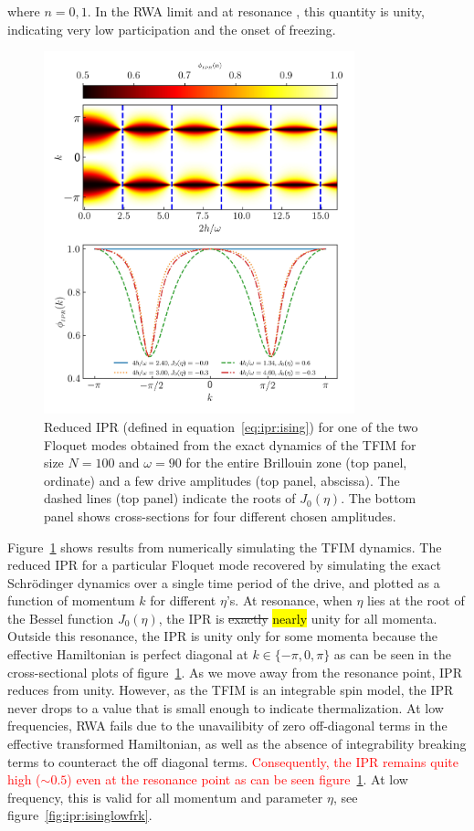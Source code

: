 \documentclass[%
reprint,
superscriptaddress,
linenumbers,
amsmath,amssymb,
aps,
prb,
showkeys,
]{revtex4-2}
\begin{document}
	where $n=0,1$. In the RWA limit and at resonance , this quantity is unity, indicating very low participation and the onset of freezing.
	\begin{figure}[t!]
		\centering
		\includegraphics[width = 9.0cm]{ising_exact_ipr.jpeg}
		\caption{Reduced IPR (defined in equation~\ref{eq:ipr:ising}) for one of the two Floquet modes obtained from the
			exact dynamics of the TFIM for size $N = 100$ and $\omega=90$ for the entire Brillouin zone (top panel, ordinate) and a few drive amplitudes (top panel, abscissa). The dashed lines (top panel) indicate the roots of $J_0(\eta)$.
			The bottom panel shows cross-sections for four different chosen amplitudes.}
		\label{fig:ipr:tfim}
	\end{figure}
	Figure~\ref{fig:ipr:tfim} shows results from numerically simulating the TFIM dynamics. The reduced IPR for a particular Floquet mode recovered by simulating the exact Schr\"odinger dynamics over a single time period of the drive, and plotted as a function of momentum $k$ for different $\eta$'s. At resonance, when $\eta$ lies at the root of the Bessel function $J_0(\eta)$,  the IPR is \st{exactly} \hl{nearly} unity for all momenta. Outside this resonance, the IPR is unity only for some momenta because the effective Hamiltonian is perfect diagonal at $k \in{\{-\pi, 0, \pi\}}$ as can be seen in the cross-sectional plots of figure~\ref{fig:ipr:tfim}. As we move away from the resonance point, IPR reduces from unity. However, as the TFIM is an integrable spin model, the IPR never drops to a value that is small enough to indicate thermalization. At low frequencies, RWA fails due to the unavailibity of zero off-diagonal terms in the  effective transformed Hamiltonian, as well as the absence of integrability breaking terms to counteract the off diagonal terms. \textcolor{red}{Consequently,  the IPR remains quite high ($\sim 0.5$) even at the resonance point as can be seen figure}~\ref{fig:ipr:tfim}. At low frequency, this is valid for all momentum and parameter $\eta$, see figure~\ref{fig:ipr:isinglowfrk}.
	
\end{document}
